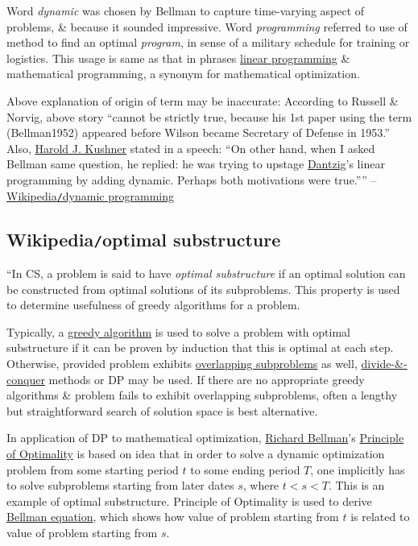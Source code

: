 \documentclass{article}
\begin{document}
Word {\it dynamic} was chosen by {\sc Bellman} to capture time-varying aspect of problems, \& because it sounded impressive. Word {\it programming} referred to use of method to find an optimal {\it program}, in sense of a military schedule for training or logistics. This usage is same as that in phrases \href{https://en.wikipedia.org/wiki/Linear_programming}{linear programming} \& mathematical programming, a synonym for mathematical optimization.

Above explanation of origin of term may be inaccurate: According to {\sc Russell \& Norvig}, above story ``cannot be strictly true, because his 1st paper using the term (Bellman1952) appeared before {\sc Wilson} became Secretary of Defense in 1953.'' Also, \href{https://en.wikipedia.org/wiki/Harold_J._Kushner}{\sc Harold J. Kushner} stated in a speech: ``On other hand, when I asked {\sc Bellman} same question, he replied: he was trying to upstage \href{https://en.wikipedia.org/wiki/George_Dantzig}{\sc Dantzig}'s linear programming by adding dynamic. Perhaps both motivations were true.'''' -- \href{https://en.wikipedia.org/wiki/Dynamic_programming}{Wikipedia{\tt/}dynamic programming}


\subsection{Wikipedia{\tt/}optimal substructure}
``In CS, a problem is said to have {\it optimal substructure} if an optimal solution can be constructed from optimal solutions of its subproblems. This property is used to determine usefulness of greedy algorithms for a problem.

Typically, a \href{https://en.wikipedia.org/wiki/Greedy_algorithm}{greedy algorithm} is used to solve a problem with optimal substructure if it can be proven by induction that this is optimal at each step. Otherwise, provided problem exhibits \href{https://en.wikipedia.org/wiki/Overlapping_subproblems}{overlapping subproblems} as well, \href{https://en.wikipedia.org/wiki/Divide_and_conquer_algorithm}{divide-\&-conquer} methods or DP may be used. If there are no appropriate greedy algorithms \& problem fails to exhibit overlapping subproblems, often a lengthy but straightforward search of solution space is best alternative.

In application of DP to mathematical optimization, \href{https://en.wikipedia.org/wiki/Richard_Bellman}{\sc Richard Bellman}'s \href{https://en.wikipedia.org/wiki/Bellman_equation#Bellman's_principle_of_optimality}{Principle of Optimality} is based on idea that in order to solve a dynamic optimization problem from some starting period $t$ to some ending period $T$, one implicitly has to solve subproblems starting from later dates $s$, where $t < s < T$. This is an example of optimal substructure. Principle of Optimality is used to derive \href{https://en.wikipedia.org/wiki/Bellman_equation}{Bellman equation}, which shows how value of problem starting from $t$ is related to value of problem starting from $s$.
\end{document}
